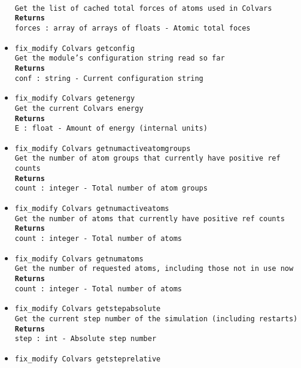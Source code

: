 \begin{itemize}
\\
\texttt{Get the list of cached total forces of atoms used in Colvars}
\\
\texttt{\textbf{Returns}}
\\
\texttt{forces : array of arrays of floats - Atomic total foces}
\item \texttt{fix\_modify Colvars getconfig}
\\
\texttt{Get the module's configuration string read so far}
\\
\texttt{\textbf{Returns}}
\\
\texttt{conf : string - Current configuration string}
\item \texttt{fix\_modify Colvars getenergy}
\\
\texttt{Get the current Colvars energy}
\\
\texttt{\textbf{Returns}}
\\
\texttt{E : float - Amount of energy (internal units)}
\item \texttt{fix\_modify Colvars getnumactiveatomgroups}
\\
\texttt{Get the number of atom groups that currently have positive ref counts}
\\
\texttt{\textbf{Returns}}
\\
\texttt{count : integer - Total number of atom groups}
\item \texttt{fix\_modify Colvars getnumactiveatoms}
\\
\texttt{Get the number of atoms that currently have positive ref counts}
\\
\texttt{\textbf{Returns}}
\\
\texttt{count : integer - Total number of atoms}
\item \texttt{fix\_modify Colvars getnumatoms}
\\
\texttt{Get the number of requested atoms, including those not in use now}
\\
\texttt{\textbf{Returns}}
\\
\texttt{count : integer - Total number of atoms}
\item \texttt{fix\_modify Colvars getstepabsolute}
\\
\texttt{Get the current step number of the simulation (including restarts)}
\\
\texttt{\textbf{Returns}}
\\
\texttt{step : int - Absolute step number}
\item \texttt{fix\_modify Colvars getsteprelative}
\\

\end{itemize}
